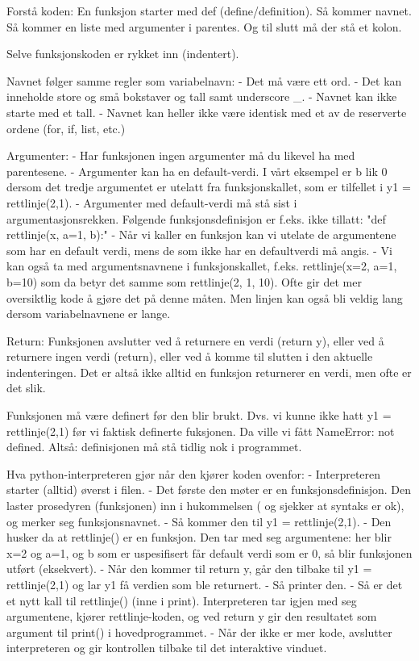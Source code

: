Forstå koden: 
En funksjon starter med def (define/definition). 
Så kommer navnet. 
Så kommer en liste med argumenter i parentes. 
Og til slutt må der stå et kolon. 

Selve funksjonskoden er rykket inn (indentert).

Navnet følger samme regler som variabelnavn: 
- Det må være ett ord.
- Det kan inneholde store og små bokstaver og tall samt underscore _.
- Navnet kan ikke starte med et tall.
- Navnet kan heller ikke være identisk med et av de reserverte ordene (for, if, list, etc.) 

Argumenter:
- Har funksjonen ingen argumenter må du likevel ha med parentesene. 
- Argumenter kan ha en default-verdi. 
    I vårt eksempel er b lik 0 dersom det tredje argumentet er utelatt fra 
    funksjonskallet, som er tilfellet i y1 = rettlinje(2,1).
- Argumenter med default-verdi må stå sist i argumentasjonsrekken. 
  Følgende funksjonsdefinisjon er f.eks. ikke tillatt:  "def rettlinje(x, a=1, b):" 
- Når vi kaller en funksjon kan vi utelate de argumentene som har en default verdi, 
  mens de som ikke har en defaultverdi må angis. 
- Vi kan også ta med argumentsnavnene i funksjonskallet, f.eks. rettlinje(x=2, a=1, b=10) 
  som da betyr det samme som rettlinje(2, 1, 10). 
  Ofte gir det mer oversiktlig kode å gjøre det på denne måten. 
  Men linjen kan også bli veldig lang dersom variabelnavnene er lange. 

Return: 
Funksjonen avslutter ved å returnere en verdi (return y), 
eller ved å returnere ingen verdi (return), 
eller ved å komme til slutten i den aktuelle indenteringen. 
Det er altså ikke alltid en funksjon returnerer en verdi, men ofte er det slik. 


Funksjonen må være definert før den blir brukt. 
Dvs. vi kunne ikke hatt y1 = rettlinje(2,1) før vi faktisk definerte fuksjonen. 
Da ville vi fått NameError: not defined. 
Altså: definisjonen må stå tidlig nok i programmet. 


Hva python-interpreteren gjør når den kjører koden ovenfor:
- Interpreteren starter (alltid) øverst i filen.
- Det første den møter er en funksjonsdefinisjon. 
  Den laster prosedyren (funksjonen) inn i hukommelsen (
  og sjekker at syntaks er ok), og merker seg funksjonsnavnet. 
- Så kommer den til y1 = rettlinje(2,1).
- Den husker da at rettlinje() er en funksjon. Den tar med seg argumentene: 
  her blir x=2 og a=1, og b som er uspesifisert får default verdi som er 0, 
  så blir funksjonen utført (eksekvert). 
- Når den kommer til return y, går den tilbake til y1 = rettlinje(2,1) 
  og lar y1 få verdien som ble returnert.
- Så printer den. 
- Så er det et nytt kall til rettlinje() (inne i print). 
  Interpreteren tar igjen med seg argumentene, kjører rettlinje-koden, 
  og ved return y gir den resultatet som argument til print() i hovedprogrammet.
- Når der ikke er mer kode, avslutter interpreteren og gir kontrollen 
  tilbake til det interaktive vinduet. 



